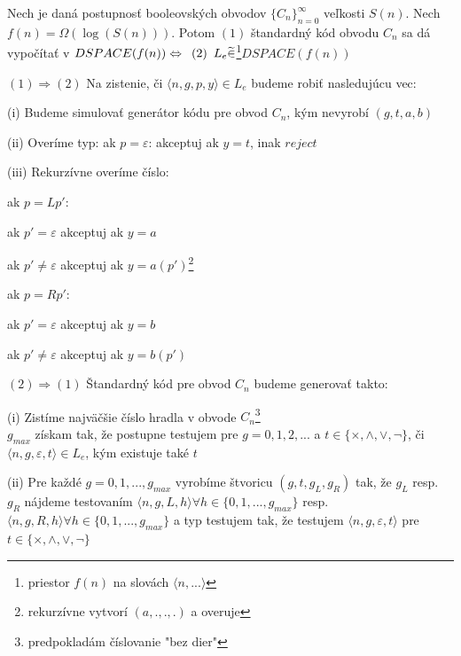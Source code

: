 \begin{lema}\label{Lema1}
  Nech je daná postupnosť booleovských obvodov $\{C_n\}_{n=0}^{\infty}$ veľkosti $S(n)$.
  Nech $f(n)=\Omega (\log(S(n)))$. Potom $(1)$ štandardný kód obvodu $C_n$ sa dá vypočítať
  v $DSPACE(f(n)) \Leftrightarrow \enspace (2) \enspace L_e \widetilde{\in}$\footnote{priestor
  $f(n)$ na slovách $\langle n,...\rangle$}$DSPACE(f(n))$
\end{lema}

\begin{dokaz}
  \begin{description}
    \item{$(1)\Rightarrow (2)$ }Na zistenie, či $\langle n,g,p,y \rangle \in L_e$ budeme robiť
    nasledujúcu vec:
      \begin{description}
      \item{(i) }Budeme simulovať generátor kódu pre obvod $C_n$, kým nevyrobí $(g,t,a,b)$
      \item{(ii) }Overíme typ: ak $p=\varepsilon$: akceptuj ak $y=t$, inak $reject$
      \item{(iii) }Rekurzívne overíme číslo:
      \begin{description}
      \item ak $p=Lp'$:
      \begin{description}
      \item ak $p'=\varepsilon$ akceptuj ak $y=a$
      \item ak $p'\neq \varepsilon$ akceptuj ak $y=a(p')$\footnote{rekurzívne vytvorí
      $(a,.,.,.)$ a overuje}
      \end{description}
      \item ak $p=Rp'$:
      \begin{description}
      \item ak $p'=\varepsilon$ akceptuj ak $y=b$
      \item ak $p'\neq \varepsilon$ akceptuj ak $y=b(p')$
      \end{description}
      \end{description}
      \end{description}
  \item{$(2)\Rightarrow (1)$ }Štandardný kód pre obvod $C_n$ budeme generovať takto:
  \begin{description}
  \item{(i) }Zistíme najväčšie číslo hradla v obvode $C_n$\footnote{predpokladám
  číslovanie "bez dier"} \\ $g_{max}$ získam tak, že postupne testujem pre $g=0,1,2,...$ a
  $t\in \{\times, \wedge, \vee, \neg\}$, či $\langle n,g,\varepsilon, t\rangle \in L_e$,
  kým existuje také $t$
  \item{(ii) }Pre každé $g=0,1,...,g_{max}$ vyrobíme štvoricu $(g,t,g_L,g_R)$ tak, že $g_L$
  resp. $g_R$ nájdeme testovaním $\langle n,g,L,h \rangle \forall h \in
  \{0,1,...,g_{max}\}$ resp. $\langle n,g,R,h \rangle \forall h \in \{0,1,...,g_{max}\}$ a
  typ testujem tak, že testujem $\langle n,g,\varepsilon,t \rangle$ pre $t\in
  \{\times,\wedge,\vee,\neg \}$
  \end{description}
  \end{description}
\end{dokaz}

